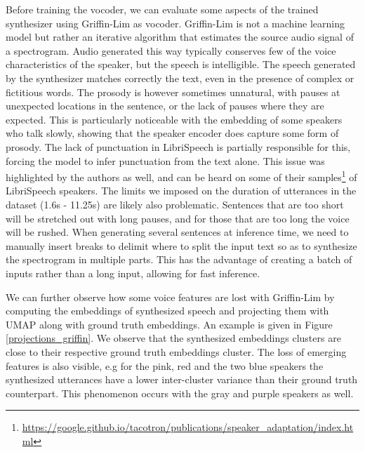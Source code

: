 \documentclass[a4paper, oneside, 12pt, english]{article}
\begin{document}
Before training the vocoder, we can evaluate some aspects of the trained synthesizer using Griffin-Lim \citep{GriffinLim} as vocoder. Griffin-Lim is not a machine learning model but rather an iterative algorithm that estimates the source audio signal of a spectrogram. Audio generated this way typically conserves few of the voice characteristics of the speaker, but the speech is intelligible. The speech generated by the synthesizer matches correctly the text, even in the presence of complex or fictitious words. The prosody is however sometimes unnatural, with pauses at unexpected locations in the sentence, or the lack of pauses where they are expected. This is particularly noticeable with the embedding of some speakers who talk slowly, showing that the speaker encoder does capture some form of prosody. The lack of punctuation in LibriSpeech is partially responsible for this, forcing the model to infer punctuation from the text alone. This issue was highlighted by the authors as well, and can be heard on some of their samples\footnote{\url{https://google.github.io/tacotron/publications/speaker_adaptation/index.html}} of LibriSpeech speakers. The limits we imposed on the duration of utterances in the dataset (1.6s - 11.25s) are likely also problematic. Sentences that are too short will be stretched out with long pauses, and for those that are too long the voice will be rushed. When generating several sentences at inference time, we need to manually insert breaks to delimit where to split the input text so as to synthesize the spectrogram in multiple parts. This has the advantage of creating a batch of inputs rather than a long input, allowing for fast inference.

We can further observe how some voice features are lost with Griffin-Lim by computing the embeddings of synthesized speech and projecting them with UMAP along with ground truth embeddings. An example is given in Figure \ref{projections_griffin}. We observe that the synthesized embeddings clusters are close to their respective ground truth embeddings cluster. The loss of emerging features is also visible, e.g for the pink, red and the two blue speakers the synthesized utterances have a lower inter-cluster variance than their ground truth counterpart. This phenomenon occurs with the gray and purple speakers as well.
\end{document}
